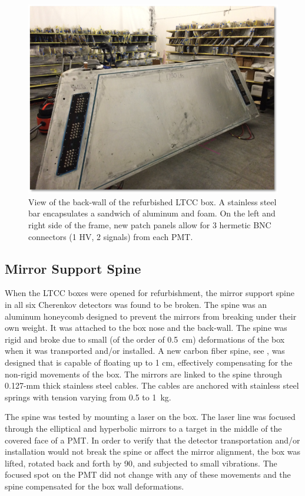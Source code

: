 \begin{figure}[h]
	\centering
	\includegraphics[width=0.99\columnwidth,keepaspectratio]{img/backWall.png}
	\caption{View of the back-wall of the refurbished LTCC box. A stainless steel bar encapsulates a sandwich of
          aluminum and foam. On the left and right side of the frame, new patch panels allow for 3 hermetic BNC
          connectors (1 HV, 2 signals) from each PMT.}
	\label{fig:backWall}
\end{figure}

\subsection{Mirror Support Spine}

When the LTCC boxes were opened for refurbishment, the mirror support spine in all six Cherenkov detectors was
found to be broken. The spine was an aluminum honeycomb designed to prevent the mirrors from breaking under their
own weight. It was attached to the box nose and the back-wall. The spine was rigid and broke due to small (of the order
of 0.5~cm) deformations of the box when it was transported and/or installed. A new carbon fiber spine, see ,
was designed that is capable of floating up to 1 cm, effectively compensating for the non-rigid movements of the box.
The mirrors are linked to the spine through 0.127-mm thick stainless steel cables. The cables are anchored with stainless
steel springs with tension varying from 0.5 to 1~kg.

The spine was tested by mounting a laser on the box. The laser line was focused through the elliptical and hyperbolic
mirrors to a target in the middle of the covered face of a PMT. In order to verify that the detector transportation
and/or installation would not break the spine or affect the mirror alignment, the box was lifted, rotated back and
forth by 90\mdeg, and subjected to small vibrations. The focused spot on the PMT did not change with any of these
movements and the spine compensated for the box wall deformations.

